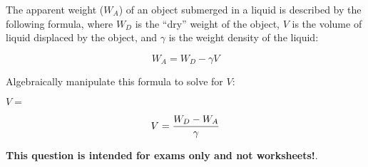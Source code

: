 

The apparent weight ($W_A$) of an object submerged in a liquid is described by the following formula, where $W_D$ is the ``dry'' weight of the object, $V$ is the volume of liquid displaced by the object, and $\gamma$ is the weight density of the liquid:

$$W_A = W_D - \gamma V$$

Algebraically manipulate this formula to solve for $V$:

\vskip 20pt

$V = $







$$V = {{W_D - W_A} \over \gamma}$$







{\bf This question is intended for exams only and not worksheets!}.



